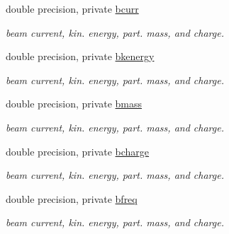 \textbf{ }\par
\begin{DoxyCompactItemize}
\item 
double precision, private \mbox{\hyperlink{namespaceaccsimulatorclass_a23e215553c71a45286be97992358dd87}{bcurr}}
\begin{DoxyCompactList}\small\item\em beam current, kin. energy, part. mass, and charge. \end{DoxyCompactList}\item 
double precision, private \mbox{\hyperlink{namespaceaccsimulatorclass_af510330940fc024c5092b4fd361c736e}{bkenergy}}
\begin{DoxyCompactList}\small\item\em beam current, kin. energy, part. mass, and charge. \end{DoxyCompactList}\item 
double precision, private \mbox{\hyperlink{namespaceaccsimulatorclass_a3f5beb7f11359c926cdc41f78c84334d}{bmass}}
\begin{DoxyCompactList}\small\item\em beam current, kin. energy, part. mass, and charge. \end{DoxyCompactList}\item 
double precision, private \mbox{\hyperlink{namespaceaccsimulatorclass_acc8e97a5abe7b5feb49058c5e9a8a5f5}{bcharge}}
\begin{DoxyCompactList}\small\item\em beam current, kin. energy, part. mass, and charge. \end{DoxyCompactList}\item 
double precision, private \mbox{\hyperlink{namespaceaccsimulatorclass_a770319e9213788860e586df0ffacd465}{bfreq}}
\begin{DoxyCompactList}\small\item\em beam current, kin. energy, part. mass, and charge. \end{DoxyCompactList}\end{DoxyCompactItemize}

